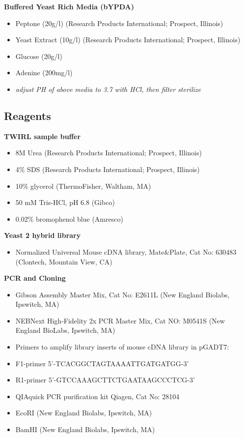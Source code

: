 \documentclass[11pt,fleqn]{book} %
\begin{document}
\textbf{Buffered Yeast Rich Media (bYPDA)}

\begin{itemize}
    \item Peptone (20g/l) (Research Products International; Prospect, Illinois)
    \item Yeast Extract (10g/l) (Research Products International; Prospect, Illinois)
    \item Glucose (20g/l)
    \item Adenine (200mg/l)
    \item \emph{adjust PH of above media to 3.7 with HCl, then filter sterilize}
\end{itemize}

\subsection{Reagents}

\textbf{TWIRL sample buffer}

\begin{itemize}
    \item 8M Urea (Research Products International; Prospect, Illinois)
    \item 4\% SDS (Research Products International; Prospect, Illinois)
    \item 10\% glycerol (ThermoFisher, Waltham, MA)
    \item 50 mM Tris-HCl, pH 6.8 (Gibco)
    \item 0.02\% bromophenol blue (Amresco)
\end{itemize}

\textbf{Yeast 2 hybrid library}

\begin{itemize}
    \item Normalized Universal Mouse cDNA library, Mate\&Plate, Cat No: 630483 (Clontech, Mountain View, CA)
\end{itemize}

\textbf{PCR and Cloning}

\begin{itemize}
    \item Gibson Assembly Master Mix, Cat No: E2611L (New England Biolabs, Ipswitch, MA)
    \item NEBNext High-Fidelity 2x PCR Master Mix, Cat NO: M0541S (New England BioLabs, Ipswitch, MA)
    \item Primers to amplify library inserts of mouse cDNA library in pGADT7:

    \item F1-primer 5’-TCACGGCTAGTAAAATTGATGATGG-3’

    \item R1-primer 5’-GTCCAAAGCTTCTGAATAAGCCCTCG-3’
    \item QIAquick PCR purification kit Qiagen, Cat No: 28104
    \item EcoRI (New England Biolabs, Ipswitch, MA)
    \item BamHI (New England Biolabs, Ipswitch, MA)
\end{itemize}
\end{document}
